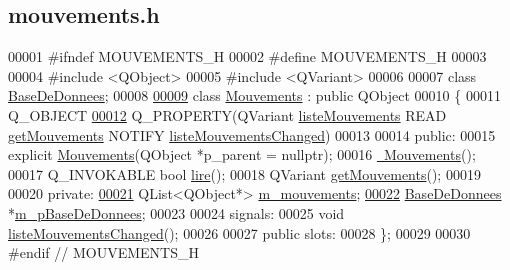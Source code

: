 \hypertarget{mouvements_8h_source}{}\subsection{mouvements.\+h}
\label{mouvements_8h_source}

\begin{DoxyCode}
00001 \textcolor{preprocessor}{#ifndef MOUVEMENTS\_H}
00002 \textcolor{preprocessor}{#define MOUVEMENTS\_H}
00003 
00004 \textcolor{preprocessor}{#include <QObject>}
00005 \textcolor{preprocessor}{#include <QVariant>}
00006 
00007 \textcolor{keyword}{class }\hyperlink{class_base_de_donnees}{BaseDeDonnees};
00008 
\hyperlink{class_mouvements}{00009} \textcolor{keyword}{class }\hyperlink{class_mouvements}{Mouvements} : \textcolor{keyword}{public} QObject
00010 \{
00011     Q\_OBJECT
\hyperlink{class_mouvements_a8f00148228ead33e98cc8e3a6ad9e806}{00012}     Q\_PROPERTY(QVariant \hyperlink{class_mouvements_a8f00148228ead33e98cc8e3a6ad9e806}{listeMouvements} READ \hyperlink{class_mouvements_a3ab449208a00af567cc5f638d12b98ef}{getMouvements} NOTIFY 
      \hyperlink{class_mouvements_af7abb930cc252388d03b74b144b83084}{listeMouvementsChanged})
00013 
00014 \textcolor{keyword}{public}:
00015     \textcolor{keyword}{explicit} \hyperlink{class_mouvements_a42a511c836761016e503d66850da0b35}{Mouvements}(QObject *p\_parent = \textcolor{keyword}{nullptr});
00016     \hyperlink{class_mouvements_a89683efbe6894fe23d05c0a7bd6e5d23}{~Mouvements}();
00017     Q\_INVOKABLE \textcolor{keywordtype}{bool} \hyperlink{class_mouvements_a1d8306c0672efe509e71d2bdbd60208b}{lire}();
00018     QVariant \hyperlink{class_mouvements_a3ab449208a00af567cc5f638d12b98ef}{getMouvements}();
00019 
00020 \textcolor{keyword}{private}:
\hyperlink{class_mouvements_a5de7bbf3118ba8257e270011f2edf152}{00021}     QList<QObject*> \hyperlink{class_mouvements_a5de7bbf3118ba8257e270011f2edf152}{m\_mouvements};
\hyperlink{class_mouvements_a8cb8047917f2e94adf9798c40b618d31}{00022}     \hyperlink{class_base_de_donnees}{BaseDeDonnees} *\hyperlink{class_mouvements_a8cb8047917f2e94adf9798c40b618d31}{m\_pBaseDeDonnees};
00023 
00024 signals:
00025     \textcolor{keywordtype}{void} \hyperlink{class_mouvements_af7abb930cc252388d03b74b144b83084}{listeMouvementsChanged}();
00026 
00027 \textcolor{keyword}{public} slots:
00028 \};
00029 
00030 \textcolor{preprocessor}{#endif // MOUVEMENTS\_H}
\end{DoxyCode}
